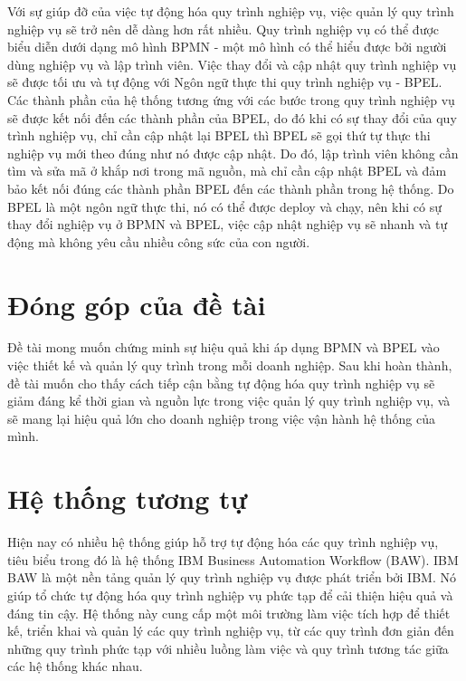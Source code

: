Với sự giúp đỡ của việc tự động hóa quy trình nghiệp vụ, việc quản lý quy trình nghiệp vụ sẽ trở nên dễ dàng hơn rất nhiều. Quy trình nghiệp vụ có thể được biểu diễn dưới dạng mô hình BPMN - một mô hình có thể hiểu được bởi người dùng nghiệp vụ và lập trình viên. Việc thay đổi và cập nhật quy trình nghiệp vụ sẽ được tối ưu và tự động với Ngôn ngữ thực thi quy trình nghiệp vụ - BPEL. Các thành phần của hệ thống tương ứng với các bước trong quy trình nghiệp vụ sẽ được kết nối đến các thành phần của BPEL, do đó khi có sự thay đổi của quy trình nghiệp vụ, chỉ cần cập nhật lại BPEL thì BPEL sẽ gọi thứ tự thực thi nghiệp vụ mới theo đúng như nó được cập nhật. Do đó, lập trình viên không cần tìm và sửa mã ở khắp nơi trong mã nguồn, mà chỉ cần cập nhật BPEL và đảm bảo kết nối đúng các thành phần BPEL đến các thành phần trong hệ thống. Do BPEL là một ngôn ngữ thực thi, nó có thể được deploy và chạy, nên khi có sự thay đổi nghiệp vụ ở BPMN và BPEL, việc cập nhật nghiệp vụ sẽ nhanh và tự động mà không yêu cầu nhiều công sức của con người.

\section{Đóng góp của đề tài}
\hspace{0.5cm} Đề tài mong muốn chứng minh sự hiệu quả khi áp dụng BPMN và BPEL vào việc thiết kế và quản lý quy trình trong mỗi doanh nghiệp. Sau khi hoàn thành, đề tài muốn cho thấy cách tiếp cận bằng tự động hóa quy trình nghiệp vụ sẽ giảm đáng kể thời gian và nguồn lực trong việc quản lý quy trình nghiệp vụ, và sẽ mang lại hiệu quả lớn cho doanh nghiệp trong việc vận hành hệ thống của mình.

\section{Hệ thống tương tự}
\hspace{0.5cm} Hiện nay có nhiều hệ thống giúp hỗ trợ tự động hóa các quy trình nghiệp vụ, tiêu biểu trong đó là hệ thống IBM Business Automation Workflow (BAW). IBM BAW là một nền tảng quản lý quy trình nghiệp vụ được phát triển bởi IBM. Nó giúp tổ chức tự động hóa quy trình nghiệp vụ phức tạp để cải thiện hiệu quả và đáng tin cậy. Hệ thống này cung cấp một môi trường làm việc tích hợp để thiết kế, triển khai và quản lý các quy trình nghiệp vụ, từ các quy trình đơn giản đến những quy trình phức tạp với nhiều luồng làm việc và quy trình tương tác giữa các hệ thống khác nhau.\\


